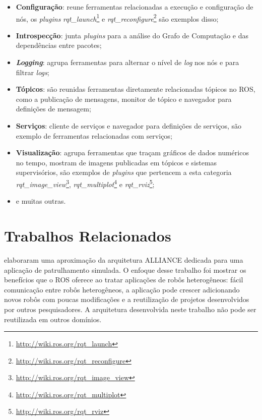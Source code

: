             \begin{itemize}
                \item \textbf{Configuração}: reune ferramentas relacionadas a execução e configuração de nós, os \textit{plugins} \textit{rqt\_launch}\footnote{\url{http://wiki.ros.org/rqt_launch}} e \textit{rqt\_reconfigure}\footnote{\url{http://wiki.ros.org/rqt_reconfigure}} são exemplos disso;
                
                \item \textbf{Introspecção}: junta \textit{plugins} para a análise do Grafo de Computação e das dependências entre pacotes;
                
                \item \textbf{\textit{Logging}}: agrupa ferramentas para alternar o nível de \textit{log} nos nós e para filtrar \textit{logs};
                
                \item \textbf{Tópicos}: são reunidas ferramentas diretamente relacionadas tópicos no ROS, como a publicação de mensagens, monitor de tópico e navegador para definições de mensagem;
                
                \item \textbf{Serviços}: cliente de serviços e navegador para definições de serviços, são exemplo de ferramentas relacionadas com serviços;
                
                \item \textbf{Visualização}: agrupa ferramentas que traçam gráficos de dados numéricos no tempo, mostram de imagens publicadas em tópicos e sistemas supervisórios, são exemplos de \textit{plugins} que pertencem a esta categoria \textit{rqt\_image\_view}\footnote{\url{http://wiki.ros.org/rqt_image_view}}, \textit{rqt\_multiplot}\footnote{\url{http://wiki.ros.org/rqt_multiplot}} e \textit{rqt\_rviz}\footnote{\url{http://wiki.ros.org/rqt_rviz}};
                
                \item e muitas outras.
            \end{itemize}
        
    \section{Trabalhos Relacionados} \label{sec:trabalhos_relacionados}
         elaboraram uma aproximação da arquitetura ALLIANCE dedicada para uma aplicação de patrulhamento simulada. O enfoque desse trabalho foi mostrar os benefícios que o ROS oferece ao tratar aplicações de robôs heterogêneos: fácil comunicação entre robôs heterogêneos, a aplicação pode crescer adicionando novos robôs com poucas modificações e a reutilização de projetos desenvolvidos por outros pesquisadores. A arquitetura desenvolvida neste trabalho não pode ser reutilizada em outros domínios.
        
